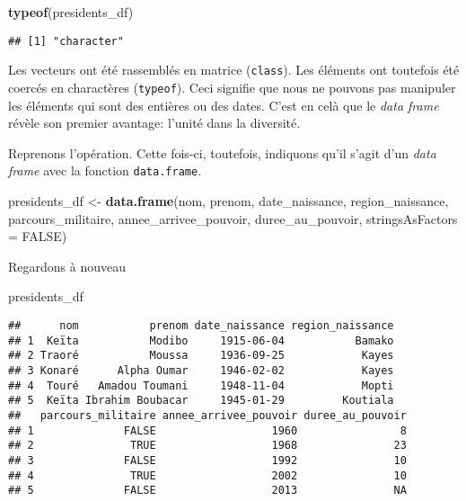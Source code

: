 \documentclass[]{book}
\newenvironment{Shaded}{\begin{snugshade}}{\end{snugshade}}
\newcommand{\KeywordTok}[1]{\textcolor[rgb]{0.13,0.29,0.53}{\textbf{#1}}}
\newcommand{\DataTypeTok}[1]{\textcolor[rgb]{0.13,0.29,0.53}{#1}}
\newcommand{\StringTok}[1]{\textcolor[rgb]{0.31,0.60,0.02}{#1}}
\newcommand{\OtherTok}[1]{\textcolor[rgb]{0.56,0.35,0.01}{#1}}
\newcommand{\NormalTok}[1]{#1}
\begin{document}
\begin{Shaded}
\begin{Highlighting}[]
\KeywordTok{typeof}\NormalTok{(presidents_df)}
\end{Highlighting}
\end{Shaded}

\begin{verbatim}
## [1] "character"
\end{verbatim}

Les vecteurs ont été rassemblés en matrice (\texttt{class}). Les
éléments ont toutefois été coercés en charactères (\texttt{typeof}).
Ceci signifie que nous ne pouvons pas manipuler les éléments qui sont
des entières ou des dates. C'est en celà que le \emph{data frame} révèle
son premier avantage: l'unité dans la diversité.

Reprenons l'opération. Cette fois-ci, toutefois, indiquons qu'il s'agit
d'un \emph{data frame} avec la fonction \texttt{data.frame}.

\begin{Shaded}
\begin{Highlighting}[]
\NormalTok{presidents_df <-}\StringTok{ }\KeywordTok{data.frame}\NormalTok{(nom,}
\NormalTok{                            prenom, }
\NormalTok{                            date_naissance, }
\NormalTok{                            region_naissance, }
\NormalTok{                            parcours_militaire, }
\NormalTok{                            annee_arrivee_pouvoir, }
\NormalTok{                            duree_au_pouvoir,}
                            \DataTypeTok{stringsAsFactors =} \OtherTok{FALSE}\NormalTok{)}
\end{Highlighting}
\end{Shaded}

Regardons à nouveau

\begin{Shaded}
\begin{Highlighting}[]
\NormalTok{presidents_df}
\end{Highlighting}
\end{Shaded}

\begin{verbatim}
##      nom           prenom date_naissance region_naissance
## 1  Keïta           Modibo     1915-06-04           Bamako
## 2 Traoré           Moussa     1936-09-25            Kayes
## 3 Konaré      Alpha Oumar     1946-02-02            Kayes
## 4  Touré   Amadou Toumani     1948-11-04            Mopti
## 5  Keïta Ibrahim Boubacar     1945-01-29         Koutiala
##   parcours_militaire annee_arrivee_pouvoir duree_au_pouvoir
## 1              FALSE                  1960                8
## 2               TRUE                  1968               23
## 3              FALSE                  1992               10
## 4               TRUE                  2002               10
## 5              FALSE                  2013               NA
\end{verbatim}
\end{document}
